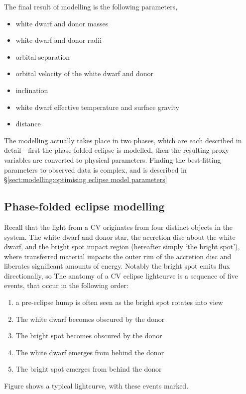 The final result of modelling is the following parameters,
\begin{itemize}
    \item white dwarf and donor masses
    \item white dwarf and donor radii
    \item orbital separation
    \item orbital velocity of the white dwarf and donor
    \item inclination
    \item white dwarf effective temperature and surface gravity
    \item distance
\end{itemize}

The modelling actually takes place in two phases, which are each described in detail - first the phase-folded eclipse is modelled, then the resulting proxy variables are converted to physical parameters. Finding the best-fitting parameters to observed data is complex, and is described in \S\ref{sect:modelling:optimising eclipse model parameters} 

\subsection{Phase-folded eclipse modelling}\label{sect:modelling:eclipse modelling}

Recall that the light from a CV originates from four distinct objects in the system. The white dwarf and donor star, the accretion disc about the white dwarf, and the bright spot impact region (hereafter simply `the bright spot'), where transferred material impacts the outer rim of the accretion disc and liberates significant amounts of energy. Notably the bright spot emits flux directionally, so
The anatomy of a CV eclipse lightcurve is a sequence of five events, that occur in the following order:
\begin{enumerate}
    \item a pre-eclipse hump is often seen as the bright spot rotates into view
    \item The white dwarf becomes obscured by the donor
    \item The bright spot becomes obscured by the donor
    \item The white dwarf emerges from behind the donor
    \item The bright spot emerges from behind the donor
\end{enumerate}
Figure shows a typical lightcurve, with these events marked.

